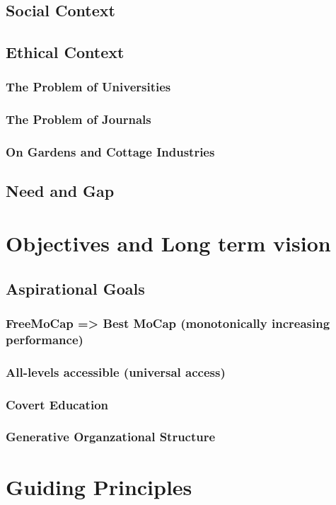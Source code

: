 \documentclass[11pt]{article}
\begin{document}
\subsection{Social Context}
\subsection{Ethical Context}
\subsubsection{The Problem of Universities}
\subsubsection{The Problem of Journals}
\subsubsection{On Gardens and Cottage Industries}
\subsection{Need and Gap}

\section{Objectives and Long term vision}
\subsection{Aspirational Goals}
\subsubsection{FreeMoCap => Best MoCap (monotonically increasing performance)}
\subsubsection{All-levels accessible (universal access)}
\subsubsection{Covert Education}
\subsubsection{Generative Organzational Structure}


\section{Guiding Principles}
\end{document}
